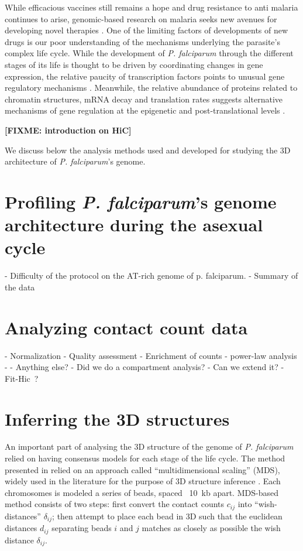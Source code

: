 \documentclass[letterpaper,12pt]{article}
\newcommand{\fixme}[1]{\textbf{[FIXME: #1]}}
\begin{document}
While efficacious vaccines still remains a hope and drug resistance to anti
malaria continues to arise, genomic-based research on malaria seeks new
avenues for developing novel therapies \citet{kirchner:recent}. One of the
limiting factors of developments of new drugs is our poor understanding of the
mechanisms underlying the parasite's complex life cycle. While the development
of {\em P. falciparum} through the different stages of its life is thought to
be driven by coordinating changes in gene expression, the relative paucity of
transcription factors points to unusual gene regulatory mechanisms . Meanwhile,
the relative abundance of proteins related to chromatin structures, mRNA decay
and translation rates suggests alternative mechanisms of gene regulation at the
epigenetic and post-translational levels
\citep{cui:chromatin-mediated, duffy:role, hoeijmakers:placing,
horrocks:control, deitsch:mechanisms}.


\fixme{introduction on HiC}


We discuss below the analysis methods used and developed for studying the 3D
architecture of {\em P. falciparum}'s genome.

\section{Profiling {\em P. falciparum}'s genome architecture during the
asexual cycle}
\label{sec:data}

- Difficulty of the protocol on the AT-rich genome of p. falciparum.
- Summary of the data



\section{Analyzing contact count data}

- Normalization
- Quality assessment
- Enrichment of counts
- power-law analysis
- 
- Anything else?
    - Did we do a compartment analysis?
- Can we extend it?
  - Fit-Hic ?

\section{Inferring the 3D structures}

An important part of analysing the 3D structure of the genome of \textit{P.
falciparum} relied on having consensus models for each stage of the life
cycle. The method presented in \citet{ay:three-dimensional} relied on an
approach called ``multidimensional scaling'' (MDS), widely used in the
literature for the purpose of 3D structure inference
\citep{duan:three-dimensional, varoquaux:statistical, bau:, tanizawa:}. Each chromosomes is
modeled a series of beads, spaced ~10~kb apart. MDS-based method consists of
two steps: first convert the
contact counts $c_{ij}$ into ``wish-distances'' $\delta_{ij}$; then attempt
to place each bead in 3D such that the euclidean distances $d_{ij}$ separating
beads $i$ and $j$ matches as closely as possible the wish distance
$\delta_{ij}$.
\end{document}
